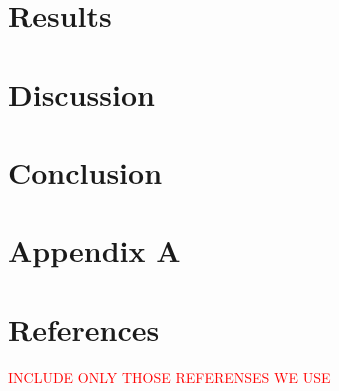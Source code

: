 \documentclass[norsk,a4paper,12pt]{article}
\begin{document}
\section{Results} \label{sec:Results}

\section{Discussion} \label{sec:Discussion}

\section{Conclusion} \label{sec:Conclusion}

\newpage

\section{Appendix A} \label{sec:appendix_A}

\newpage
\section{References}

\textcolor{red}{INCLUDE ONLY THOSE REFERENSES WE USE}
\end{document}
